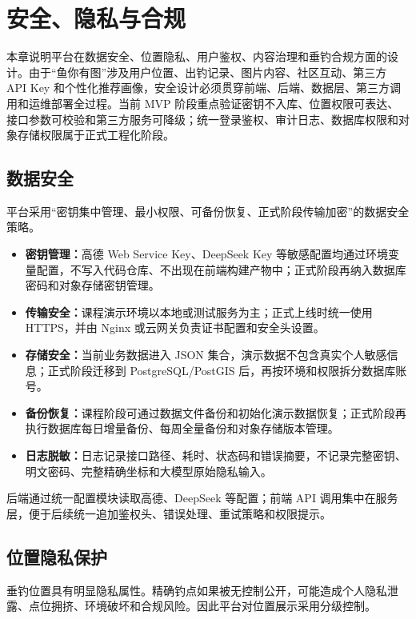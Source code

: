 ﻿\section{安全、隐私与合规}

本章说明平台在数据安全、位置隐私、用户鉴权、内容治理和垂钓合规方面的设计。由于“鱼你有图”涉及用户位置、出钓记录、图片内容、社区互动、第三方 API Key 和个性化推荐画像，安全设计必须贯穿前端、后端、数据层、第三方调用和运维部署全过程。当前 MVP 阶段重点验证密钥不入库、位置权限可表达、接口参数可校验和第三方服务可降级；统一登录鉴权、审计日志、数据库权限和对象存储权限属于正式工程化阶段。

\subsection{数据安全}

平台采用“密钥集中管理、最小权限、可备份恢复、正式阶段传输加密”的数据安全策略。

\begin{itemize}
  \item \textbf{密钥管理：}高德 Web Service Key、DeepSeek Key 等敏感配置均通过环境变量配置，不写入代码仓库、不出现在前端构建产物中；正式阶段再纳入数据库密码和对象存储密钥管理。
  \item \textbf{传输安全：}课程演示环境以本地或测试服务为主；正式上线时统一使用 HTTPS，并由 Nginx 或云网关负责证书配置和安全头设置。
  \item \textbf{存储安全：}当前业务数据进入 JSON 集合，演示数据不包含真实个人敏感信息；正式阶段迁移到 PostgreSQL/PostGIS 后，再按环境和权限拆分数据库账号。
  \item \textbf{备份恢复：}课程阶段可通过数据文件备份和初始化演示数据恢复；正式阶段再执行数据库每日增量备份、每周全量备份和对象存储版本管理。
  \item \textbf{日志脱敏：}日志记录接口路径、耗时、状态码和错误摘要，不记录完整密钥、明文密码、完整精确坐标和大模型原始隐私输入。
\end{itemize}

后端通过统一配置模块读取高德、DeepSeek 等配置；前端 API 调用集中在服务层，便于后续统一追加鉴权头、错误处理、重试策略和权限提示。

\subsection{位置隐私保护}

垂钓位置具有明显隐私属性。精确钓点如果被无控制公开，可能造成个人隐私泄露、点位拥挤、环境破坏和合规风险。因此平台对位置展示采用分级控制。

